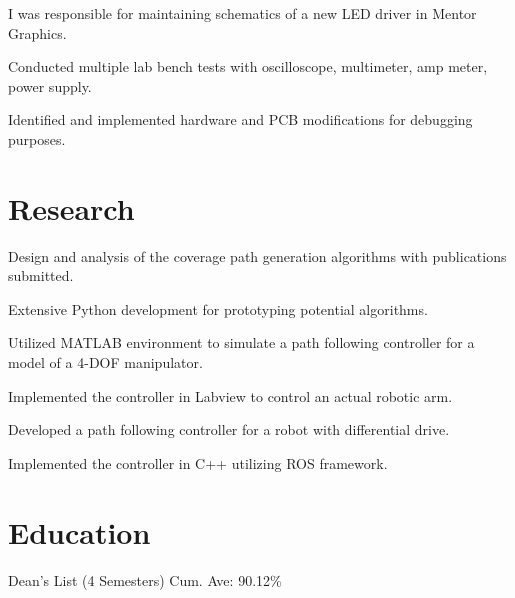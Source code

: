 \documentclass[]{deedy-resume-openfont}
\begin{document}
\begin{tightemize}
\item I was responsible for maintaining schematics of a new LED driver in Mentor Graphics.
\item Conducted multiple lab bench tests with oscilloscope, multimeter, amp meter, power supply.
\item Identified and implemented hardware and PCB modifications for debugging purposes.
\end{tightemize}
\sectionsep



\section{Research}
\begin{tightemize}
\item Design and analysis of the coverage path generation algorithms with publications submitted.
\item Extensive Python development for prototyping potential algorithms.
\end{tightemize}
\sectionsep

\begin{tightemize}
\item Utilized MATLAB environment to simulate a path following controller for a model of a 4-DOF manipulator.
\item Implemented the controller in Labview to control an actual robotic arm.
\item Developed a path following controller for a robot with differential drive.
\item Implemented the controller in C++ utilizing ROS framework.
\end{tightemize}
\sectionsep

\section{Education}
\sectionsep

Dean's List (4 Semesters) \textbullet{}
Cum. Ave: 90.12\% \\
\sectionsep
\end{document}
